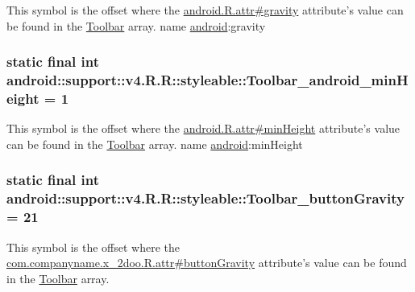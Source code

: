 This symbol is the offset where the \hyperlink{}{android.R.attr\#gravity} attribute's value can be found in the \hyperlink{classandroid_1_1support_1_1v4_1_1_r_1_1styleable_0646d71cfbd4a8645c7d805b33e1c574}{Toolbar} array.  name \hyperlink{namespaceandroid}{android}:gravity \hypertarget{classandroid_1_1support_1_1v4_1_1_r_1_1styleable_66c75941c3656f61bf62178c80516261}{
\subsubsection[{Toolbar\_\-android\_\-minHeight}]{\setlength{\rightskip}{0pt plus 5cm}static final int android::support::v4.R.R::styleable::Toolbar\_\-android\_\-minHeight = 1}}
\label{classandroid_1_1support_1_1v4_1_1_r_1_1styleable_66c75941c3656f61bf62178c80516261}


This symbol is the offset where the \hyperlink{}{android.R.attr\#minHeight} attribute's value can be found in the \hyperlink{classandroid_1_1support_1_1v4_1_1_r_1_1styleable_0646d71cfbd4a8645c7d805b33e1c574}{Toolbar} array.  name \hyperlink{namespaceandroid}{android}:minHeight \hypertarget{classandroid_1_1support_1_1v4_1_1_r_1_1styleable_5280809e355d936bf33f4570e3e220a3}{
\subsubsection[{Toolbar\_\-buttonGravity}]{\setlength{\rightskip}{0pt plus 5cm}static final int android::support::v4.R.R::styleable::Toolbar\_\-buttonGravity = 21}}
\label{classandroid_1_1support_1_1v4_1_1_r_1_1styleable_5280809e355d936bf33f4570e3e220a3}


This symbol is the offset where the \hyperlink{classcom_1_1companyname_1_1x__2doo_1_1_r_1_1attr_1cedb514b5a3dc058a1bffef0391db7a}{com.companyname.x\_\-2doo.R.attr\#buttonGravity} attribute's value can be found in the \hyperlink{classandroid_1_1support_1_1v4_1_1_r_1_1styleable_0646d71cfbd4a8645c7d805b33e1c574}{Toolbar} array.


